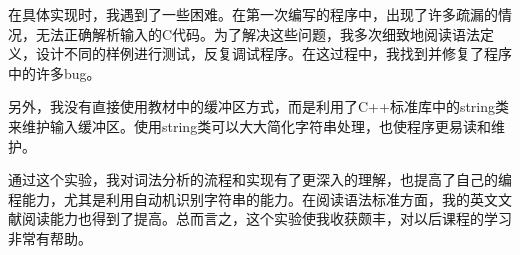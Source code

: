 \documentclass[lang=cn,11pt,a4paper]{elegantpaper}
\begin{document}
在具体实现时，我遇到了一些困难。在第一次编写的程序中，出现了许多疏漏的情况，无法正确解析输入的C代码。为了解决这些问题，我多次细致地阅读语法定义，设计不同的样例进行测试，反复调试程序。在这过程中，我找到并修复了程序中的许多bug。

另外，我没有直接使用教材中的缓冲区方式，而是利用了C++标准库中的string类来维护输入缓冲区。使用string类可以大大简化字符串处理，也使程序更易读和维护。

通过这个实验，我对词法分析的流程和实现有了更深入的理解，也提高了自己的编程能力，尤其是利用自动机识别字符串的能力。在阅读语法标准方面，我的英文文献阅读能力也得到了提高。总而言之，这个实验使我收获颇丰，对以后课程的学习非常有帮助。




\end{document}
